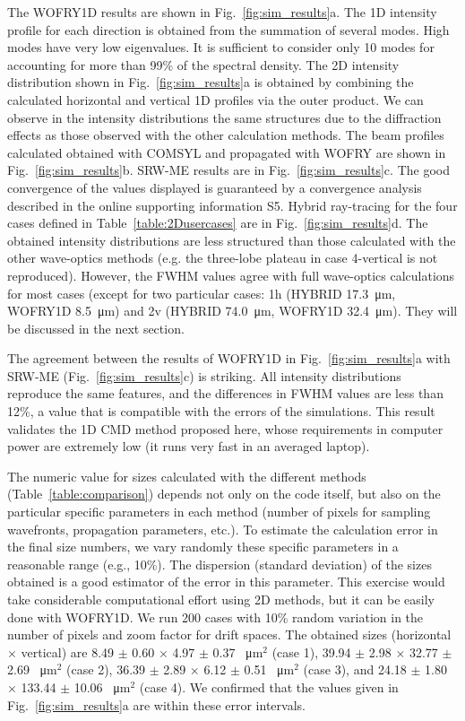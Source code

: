 \documentclass{iucr}
\newcommand{\inblue}[1]{{\color{blue}#1}}
\begin{document}
The WOFRY1D results are shown in \inblue{Fig.~\ref{fig:sim_results}a}. The 1D intensity profile for each direction is obtained from the summation of several modes. High modes have very low eigenvalues. It is sufficient to consider only 10 modes for accounting for more than 99\% of the spectral density. The 2D intensity distribution shown in \inblue{Fig.~\ref{fig:sim_results}a} is obtained by combining the calculated horizontal and vertical 1D profiles via the outer product. 
We can observe in the intensity distributions the same structures due to the diffraction effects as those observed with the other calculation methods.
The beam profiles calculated obtained with COMSYL and propagated with WOFRY are shown in \inblue{Fig.~\ref{fig:sim_results}b}. 
SRW-ME results are in \inblue{Fig.~\ref{fig:sim_results}c}. The good convergence of the values displayed is guaranteed by a convergence analysis described in the online supporting information S5.
Hybrid ray-tracing for the four cases defined in Table~\ref{table:2Dusercases} are in  \inblue{Fig.~\ref{fig:sim_results}d}. The obtained intensity distributions are less structured than those calculated with the other wave-optics methods (e.g. the three-lobe plateau in case 4-vertical is not reproduced). However, the FWHM values agree with full wave-optics calculations for most cases (except for two particular cases:
1h (HYBRID \SI{17.3}{\micro\meter}, WOFRY1D \SI{8.5}{\micro\meter}) and
2v (HYBRID \SI{74.0}{\micro\meter}, WOFRY1D \SI{32.4}{\micro\meter}). They will be discussed in the next section.

The agreement between the results of WOFRY1D in \inblue{Fig.~\ref{fig:sim_results}a }with SRW-ME (\inblue{Fig.~\ref{fig:sim_results}c}) is striking. All intensity distributions reproduce the same features, and the differences in FWHM values are less than 12\%, a value that is compatible with the errors of the simulations. 
This result validates the 1D CMD method proposed here, whose requirements in computer power are extremely low (it runs very fast in an averaged laptop). 

The numeric value for sizes calculated with the different methods (Table~\ref{table:comparison}) depends not only on the code itself, but also on the particular specific parameters in each method (number of pixels for sampling wavefronts, propagation parameters, etc.). To estimate the calculation error in the final size numbers, we vary randomly these specific parameters in a reasonable range (e.g., 10\%). The dispersion (standard deviation) of the sizes obtained is a good estimator of the error in this parameter. This exercise would take considerable computational effort using 2D methods, but it can be easily done with WOFRY1D. We run 200 cases with 10\% random variation in the number of pixels and zoom factor for drift spaces. The obtained sizes (horizontal $\times$ vertical) are  
8.49 $\pm$ 0.60 $\times$ 4.97 $\pm$ 0.37 \SI{}{\micro\meter}$^2$ (case 1),
39.94 $\pm$ 2.98 $\times$ 32.77 $\pm$ 2.69 \SI{}{\micro\meter}$^2$ (case 2),
36.39 $\pm$ 2.89 $\times$ 6.12 $\pm$ 0.51 \SI{}{\micro\meter}$^2$ (case 3), and
24.18 $\pm$ 1.80 $\times$ 133.44 $\pm$ 10.06 \SI{}{\micro\meter}$^2$ (case 4). We confirmed that the values given in \inblue{Fig.~\ref{fig:sim_results}a} are within these error intervals.
\end{document}
